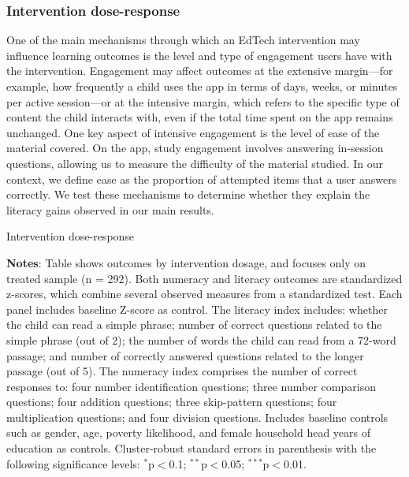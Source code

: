 \documentclass[hidelinks,12pt]{article}
\begin{document}
\begin{singlespace}
\subsubsection{Intervention dose-response} %
One of the main mechanisms through which an EdTech intervention may influence learning outcomes is the level and type of engagement users have with the intervention. Engagement may affect outcomes at the extensive margin—for example, how frequently a child uses the app in terms of days, weeks, or minutes per active session—or at the intensive margin, which refers to the specific type of content the child interacts with, even if the total time spent on the app remains unchanged. One key aspect of intensive engagement is the level of ease of the material covered. On the app, study engagement involves answering in-session questions, allowing us to measure the difficulty of the material studied. In our context, we define ease as the proportion of attempted items that a user answers correctly. We test these mechanisms to determine whether they explain the literacy gains observed in our main results.

\begingroup
\setlength{\tabcolsep}{18pt}  %
\begin{table}[h!]
   \begin{singlespace}
    \centering
    \fontsize{11pt}{11pt}\selectfont  %
    \caption{Intervention dose-response} \label{reg_main_usage}
    \begin{threeparttable}
        
        \begin{tablenotes}
             \small %
            \textbf{Notes}: Table shows outcomes by intervention dosage, and focuses only on treated sample (n = 292). Both numeracy and literacy outcomes are standardized z-scores, which combine several observed measures from a standardized test. Each panel includes baseline Z-score as control. The literacy index includes: whether the child can read a simple phrase; number of correct questions related to the simple phrase (out of 2); the number of words the child can read from a 72-word passage; and number of correctly answered questions related to the longer passage (out of 5). The numeracy index comprises the number of correct responses to: four number identification questions; three number comparison questions; four addition questions; three skip-pattern questions; four multiplication questions; and four division questions. Includes baseline controls such as gender, age, poverty likelihood, and female household head years of education as controls. Cluster-robust standard errors in parenthesis with the following significance levels: {$^{*}$p$<$0.1; $^{**}$p$<$0.05; $^{***}$p$<$0.01}.
        \end{tablenotes}
    \end{threeparttable}
    \end{singlespace}
\end{table}
\endgroup



\end{singlespace}
\end{document}
